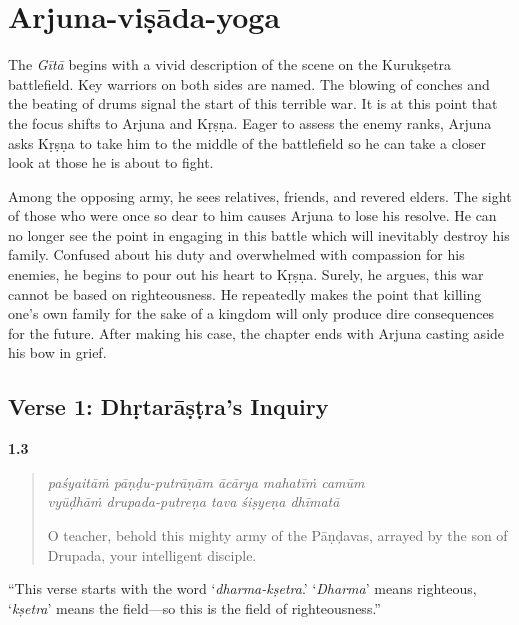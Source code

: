 \chapter{Arjuna-viṣāda-yoga}\label{chap-arjuna-visada-yoga}

\noindent The \textit{Gītā} begins with a vivid description of the scene on the Kurukṣetra battlefield. Key warriors on both sides are named. The blowing of conches and the beating of drums signal the start of this terrible war. It is at this point that the focus shifts to Arjuna and Kṛṣṇa. Eager to assess the enemy ranks, Arjuna asks Kṛṣṇa to take him to the middle of the battlefield so he can take a closer look at those he is about to fight.

Among the opposing army, he sees relatives, friends, and revered elders. The sight of those who were once so dear to him causes Arjuna to lose his resolve. He can no longer see the point in engaging in this battle which will inevitably destroy his family. Confused about his duty and overwhelmed with compassion for his enemies, he begins to pour out his heart to Kṛṣṇa. Surely, he argues, this war cannot be based on righteousness. He repeatedly makes the point that killing one’s own family for the sake of a kingdom will only produce dire consequences for the future. After making his case, the chapter ends with Arjuna casting aside his bow in grief.

\section{Verse 1: Dhṛtarāṣṭra's Inquiry}\label{sec-verse-1-dhrtarastra-s-inquiry}


\par\noindent\textbf{1.3}\par
\begin{verse}
\textit{paśyaitāṁ pāṇḍu-putrāṇām ācārya mahatīṁ camūm}\\
\textit{vyūḍhāṁ drupada-putreṇa tava śiṣyeṇa dhīmatā}

\noindent O teacher, behold this mighty army of the Pāṇḍavas, arrayed by the son of Drupada, your intelligent disciple.
\end{verse}
\par

\enquote{This verse starts with the word \enquote{\textit{dharma-kṣetra}.} \enquote{\textit{Dharma}} means righteous, \enquote{\textit{kṣetra}} means the field---so this is the field of righteousness.}

